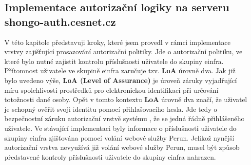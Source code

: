 \documentclass[
  printed, %
  twoside, %
  table,   %
  nolof,     %
  nolot,     %
]{fithesis3}
\begin{document}
\subsection[Implementace autorizační logiky na serveru\break shongo-auth.cesnet.cz]{Implementace autorizační logiky na serveru shongo-auth.cesnet.cz}
\label{ShongoImpl-authr}    
V této kapitole představuji kroky, které jsem provedl v rámci implementace vrstvy zajišťující prosazování autorizační politiky. Jde o autorizační politiku, ve které bylo nutné zajistit kontrolu příslušnosti uživatele do skupiny einfra. Přítomnost uživatele ve skupině einfra zaručuje tzv. \textbf{LoA} úrovně dva. Jak již bylo uvedeno výše, \textbf{LoA (Level of Assurance)} je úroveň záruky vyjadřující míru spolehlivosti prostředků pro elektronickou identifikaci při určování totožnosti dané osoby. Opět v tomto kontextu \textbf{LoA} úrovně dva značí, že uživatel je schopný ověřit svoji identitu pomocí přihlašovacího hesla. Jde tedy o bezpečnostní záruku autorizační vrstvě systému , že se jedná řádně přihlášeného uživatele. Ve stávající implementaci byly informace o příslušnosti uživatele do skupiny einfra zjišťována pomocí volání webové služby Perun. Jelikož nynější autorizační vrstva nevyužívá již volání webové služby Perun, musel být způsob představené kontroly příslušnosti uživatele do skupiny einfra nahrazen. 

\par
\end{document}
